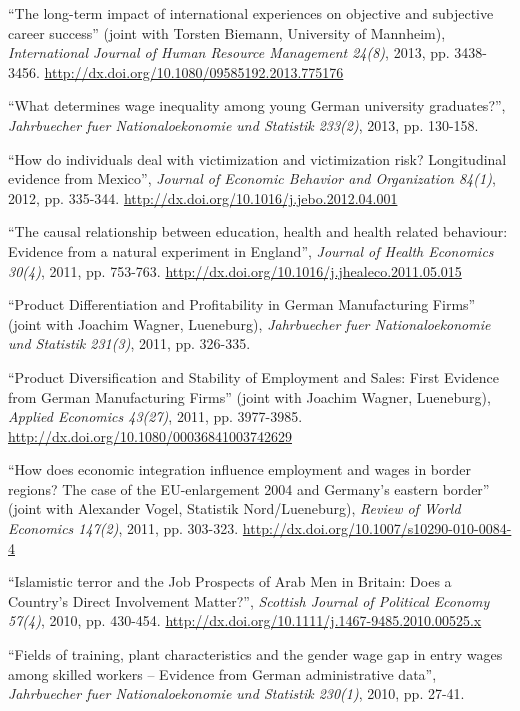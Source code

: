 \documentclass[10pt,pdftex,a4paper,oneside]{article}
\begin{document}
\begin{etaremune}
\item ``The long-term impact of international experiences on objective and subjective career success'' (joint with Torsten Biemann, University of Mannheim), \emph{International Journal of Human Resource Management 24(8)}, 2013, pp. 3438-3456.   \url{http://dx.doi.org/10.1080/09585192.2013.775176}
\item ``What determines wage inequality among young German university graduates?'',  \emph{Jahrbuecher fuer Nationaloekonomie und Statistik 233(2)}, 2013, pp. 130-158.
\item ``How do individuals deal with victimization and victimization risk? Longitudinal evidence from Mexico'', \emph{Journal of Economic Behavior and Organization 84(1)}, 2012, pp. 335-344.   \url{http://dx.doi.org/10.1016/j.jebo.2012.04.001}
\item ``The causal relationship between education, health and health related behaviour: Evidence from a natural experiment in England'', \emph{Journal of Health Economics 30(4)}, 2011, pp. 753-763.   \url{http://dx.doi.org/10.1016/j.jhealeco.2011.05.015}
\item ``Product Differentiation and Profitability in German Manufacturing Firms'' (joint with Joachim Wagner, Lueneburg), \emph{Jahrbuecher fuer Nationaloekonomie und Statistik 231(3)}, 2011, pp. 326-335.
\item ``Product Diversification and Stability of Employment and Sales: First Evidence from German Manufacturing Firms'' (joint with Joachim Wagner, Lueneburg), \emph{Applied Economics 43(27)}, 2011, pp.  3977-3985.   \url{http://dx.doi.org/10.1080/00036841003742629}
\item ``How does economic integration influence employment and wages in border regions? The case of the EU-enlargement 2004 and Germany's eastern border'' (joint with Alexander Vogel, Statistik Nord/Lueneburg), \emph{Review of World Economics 147(2)}, 2011, pp. 303-323.   \url{http://dx.doi.org/10.1007/s10290-010-0084-4}
\item ``Islamistic terror and the Job Prospects of Arab Men in Britain: Does a Country's Direct Involvement Matter?'', \emph{Scottish Journal of Political Economy 57(4)}, 2010, pp. 430-454.   \url{http://dx.doi.org/10.1111/j.1467-9485.2010.00525.x}
\item ``Fields of training, plant characteristics and the gender wage gap in entry wages among skilled workers -- Evidence from German administrative data'', \emph{Jahrbuecher fuer Nationaloekonomie und Statistik 230(1)}, 2010, pp. 27-41.

\end{etaremune}
\end{document}
